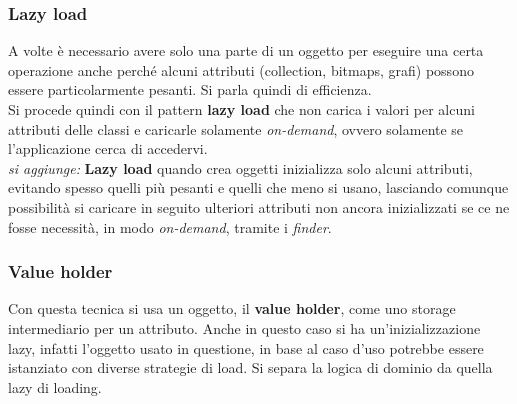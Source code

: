 \subsubsection{Lazy load}
A volte è necessario avere solo una parte di un oggetto per eseguire una certa operazione anche perché alcuni attributi (collection, bitmaps, grafi) possono essere particolarmente pesanti. Si parla quindi di efficienza.\\ 
Si procede quindi con il pattern \textbf{lazy load} che non carica i valori per alcuni attributi delle classi e caricarle solamente \textit{on-demand}, ovvero solamente se l'applicazione cerca di accedervi.\\ \textit{si aggiunge: } \textbf{Lazy load} quando crea oggetti inizializza solo alcuni attributi, evitando spesso quelli più pesanti e quelli che meno si usano, lasciando comunque possibilità si caricare in seguito ulteriori attributi non ancora inizializzati se ce ne fosse necessità, in modo \textit{on-demand}, tramite i \textit{finder}.\\ 

\subsubsection{Value holder}
Con questa tecnica si usa un oggetto, il \textbf{value holder}, come uno storage intermediario per un attributo. Anche in questo caso si ha un'inizializzazione lazy, infatti l'oggetto usato in questione, in base al caso d'uso potrebbe essere istanziato con diverse strategie di load. Si separa la logica di dominio da quella lazy di loading.\\


